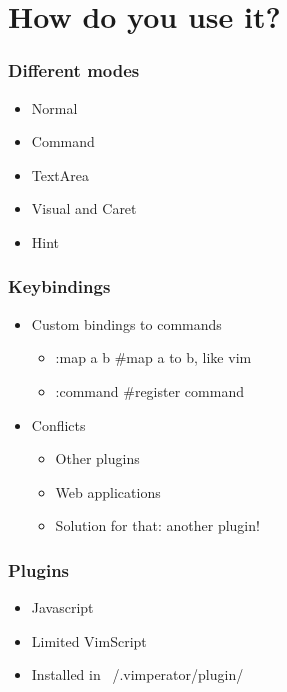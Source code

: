 \section{How do you use it?}
\setcounter{subsection}{1}

\begin{frame}
\frametitle{Different modes}
  \begin{itemize}[<+->]
    \item Normal
    \item Command
    \item TextArea
    \item Visual and Caret
    \item Hint
  \end{itemize}
\end{frame}

\begin{frame}
\frametitle{Keybindings}
  \begin{itemize}[<+->]
    \item Custom bindings to commands
      \begin{itemize}[<+->]
        \item :map a b \#map a to b, like vim
        \item :command \#register command
      \end{itemize}
    \item Conflicts
      \begin{itemize}[<+->]
        \item Other plugins
        \item Web applications
        \item Solution for that: another plugin!
      \end{itemize}
  \end{itemize}
\end{frame}

\begin{frame}
\frametitle{Plugins}
  \begin{itemize}
    \item Javascript
    \item Limited VimScript
    \item Installed in ~/.vimperator/plugin/
  \end{itemize}
\end{frame}
